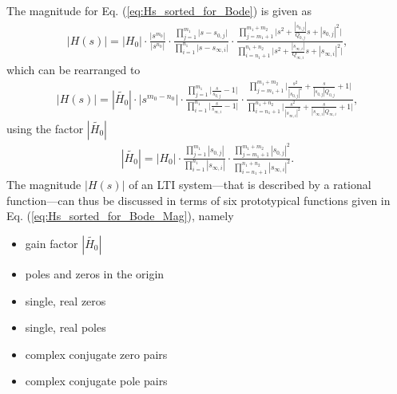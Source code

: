 \documentclass[11pt,a4paper,DIV=12]{scrartcl}
\numberwithin{equation}{section}
\numberwithin{figure}{section}
\newcommand{\eq}[1]{Eq. (\ref{#1})} %
\begin{document}
The magnitude for \eq{eq:Hs_sorted_for_Bode} is given as
\begin{align}
|H(s)| = |H_0|
\cdot
\frac
{|s^{m_0}|}
{|s^{n_0}|}
\cdot
\frac
{\prod\limits_{j=1}^{m_1} \bigg|s-s_{0,j}\bigg|}
{\prod\limits_{i=1}^{n_1} \bigg|s-s_{\infty,i}\bigg|}
\cdot
\frac
{\prod\limits_{j=m_1+1}^{m_1+m_2} \bigg|s^2 + \frac{|s_{0,j}|}{Q_{0,j}} s + |s_{0,j}|^2\bigg|}
{\prod\limits_{i=n_1+1}^{n_1+n_2} \bigg|s^2 + \frac{|s_{\infty,i}|}{Q_{\infty,i}} s + |s_{\infty,i}|^2\bigg|},
\end{align}
which can be rearranged to
\begin{align}
\label{eq:Hs_sorted_for_Bode_Mag}
|H(s)| = |\tilde{H_0}|
\cdot
|s^{m_0-n_0}|
\cdot
\frac
{\prod\limits_{j=1}^{m_1} \bigg|\frac{s}{s_{0,j}}-1\bigg|}
{\prod\limits_{i=1}^{n_1} \bigg|\frac{s}{s_{\infty,i}}-1\bigg|}
\cdot
\frac
{\prod\limits_{j=m_1+1}^{m_1+m_2} \bigg|\frac{s^2}{|s_{0,j}|^2} + \frac{s}{|s_{0,j}| Q_{0,j}} + 1\bigg|}
{\prod\limits_{i=n_1+1}^{n_1+n_2} \bigg|\frac{s^2}{|s_{\infty,i}|^2} + \frac{s}{|s_{\infty,i}| Q_{\infty,i}} + 1\bigg|},
\end{align}
using the factor $|\tilde{H_0}|$
\begin{align}
\label{eq:H0tilde}
|\tilde{H_0}| = |{H_0}|
\cdot
\frac
{\prod\limits_{j=1}^{m_1} |s_{0,j}|}
{\prod\limits_{i=1}^{n_1} |s_{\infty,i}|}
\cdot
\frac
{\prod\limits_{j=m_1+1}^{m_1+m_2} |s_{0,j}|^2}
{\prod\limits_{i=n_1+1}^{n_1+n_2} |s_{\infty,i}|^2}.
\end{align}
%
The magnitude $|H(s)|$ of an LTI system---that is described by a rational function---can
thus be discussed in terms of six prototypical functions given in
\eq{eq:Hs_sorted_for_Bode_Mag}, namely
\begin{itemize}
\item gain factor $|\tilde{H_0}|$
\item poles and zeros in the origin
\item single, real zeros
\item single, real poles
\item complex conjugate zero pairs
\item complex conjugate pole pairs
\end{itemize}
\end{document}
